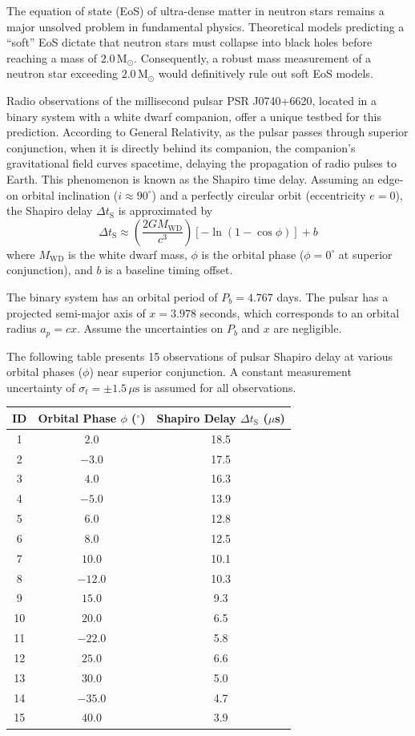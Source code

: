 The equation of state (EoS) of ultra-dense matter in neutron stars remains a
major unsolved problem in fundamental physics. Theoretical models predicting a
``soft'' EoS dictate that neutron stars must collapse into black holes before
reaching a mass of $2.0\,\mathrm{M}_\odot$. Consequently, a robust mass
measurement of a neutron star exceeding $2.0\,\mathrm{M}_\odot$ would
definitively rule out soft EoS models.

Radio observations of the millisecond pulsar PSR J0740+6620, located in a
binary system with a white dwarf companion, offer a unique testbed for this
prediction. According to General Relativity, as the pulsar passes through
superior conjunction, when it is directly behind its companion, the
companion's gravitational field curves spacetime, delaying the propagation of
radio pulses to Earth. This phenomenon is known as the Shapiro time delay.
Assuming an edge-on orbital inclination ($i \approx 90^\circ$) and a perfectly
circular orbit (eccentricity $e = 0$), the Shapiro delay
$\Delta t_{\mathrm{S}}$ is approximated by
\[
\Delta t_{\mathrm{S}} \approx
  \left(\frac{2GM_{\mathrm{WD}}}{c^3}\right)\left[-\ln\left(1-\cos\phi\right)\right] + b
\]
where $M_{\mathrm{WD}}$ is the white dwarf mass, $\phi$ is the orbital phase
($\phi = 0^\circ$ at superior conjunction), and $b$ is a baseline timing
offset.

The binary system has an orbital period of $P_b = 4.767$ days. The pulsar has
a projected semi-major axis of $x = 3.978$ seconds, which corresponds to an
orbital radius $a_p = cx$. Assume the uncertainties on $P_b$ and $x$ are
negligible.

The following table presents 15 observations of pulsar Shapiro delay at
various orbital phases ($\phi$) near superior conjunction. A constant
measurement uncertainty of $\sigma_t = \pm 1.5\,\mu\mathrm{s}$ is assumed for
all observations.

\begin{center}
\begin{tabular}{ccc}
\toprule
ID & Orbital Phase $\phi$ ($^\circ$) & Shapiro Delay $\Delta t_{\mathrm{S}}$ ($\mu$s) \\
\midrule
1  & $2.0$   & 18.5 \\
2  & $-3.0$  & 17.5 \\
3  & $4.0$   & 16.3 \\
4  & $-5.0$  & 13.9 \\
5  & $6.0$   & 12.8 \\
6  & $8.0$   & 12.5 \\
7  & $10.0$  & 10.1 \\
8  & $-12.0$ & 10.3 \\
9  & $15.0$  & 9.3 \\
10 & $20.0$  & 6.5 \\
11 & $-22.0$ & 5.8 \\
12 & $25.0$  & 6.6 \\
13 & $30.0$  & 5.0 \\
14 & $-35.0$ & 4.7 \\
15 & $40.0$  & 3.9 \\
\bottomrule
\end{tabular}
\end{center}

